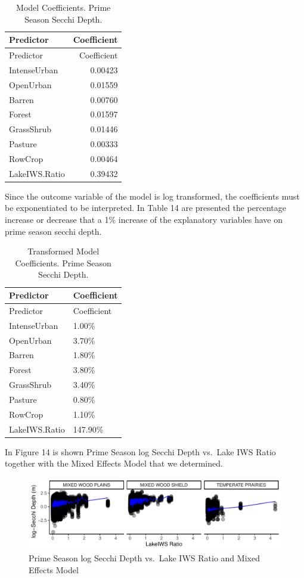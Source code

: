\documentclass[12pt,]{article}
\begin{document}
\newpage

\begin{longtable}[]{@{}lr@{}}
\caption{Model Coefficients. Prime Season Secchi Depth.}\tabularnewline
\toprule
Predictor & Coefficient\tabularnewline
\midrule
\endfirsthead
\toprule
Predictor & Coefficient\tabularnewline
\midrule
\endhead
IntenseUrban & 0.00423\tabularnewline
OpenUrban & 0.01559\tabularnewline
Barren & 0.00760\tabularnewline
Forest & 0.01597\tabularnewline
GrassShrub & 0.01446\tabularnewline
Pasture & 0.00333\tabularnewline
RowCrop & 0.00464\tabularnewline
LakeIWS.Ratio & 0.39432\tabularnewline
\bottomrule
\end{longtable}

Since the outcome variable of the model is log transformed, the
coefficients must be exponentiated to be interpreted. In Table 14 are
presented the percentage increase or decrease that a 1\% increase of the
explanatory variables have on prime season secchi depth.

\begin{longtable}[]{@{}ll@{}}
\caption{Transformed Model Coefficients. Prime Season Secchi
Depth.}\tabularnewline
\toprule
Predictor & Coefficient\tabularnewline
\midrule
\endfirsthead
\toprule
Predictor & Coefficient\tabularnewline
\midrule
\endhead
IntenseUrban & 1.00\%\tabularnewline
OpenUrban & 3.70\%\tabularnewline
Barren & 1.80\%\tabularnewline
Forest & 3.80\%\tabularnewline
GrassShrub & 3.40\%\tabularnewline
Pasture & 0.80\%\tabularnewline
RowCrop & 1.10\%\tabularnewline
LakeIWS.Ratio & 147.90\%\tabularnewline
\bottomrule
\end{longtable}

In Figure 14 is shown Prime Season log Secchi Depth vs.~Lake IWS Ratio
together with the Mixed Effects Model that we determined.

\begin{figure}
\centering
\includegraphics{Bollt_Greif_Raby_Roth_Project_Final_files/figure-latex/unnamed-chunk-29-1.pdf}
\caption{Prime Season log Secchi Depth vs.~Lake IWS Ratio and Mixed
Effects Model}
\end{figure}
\end{document}
